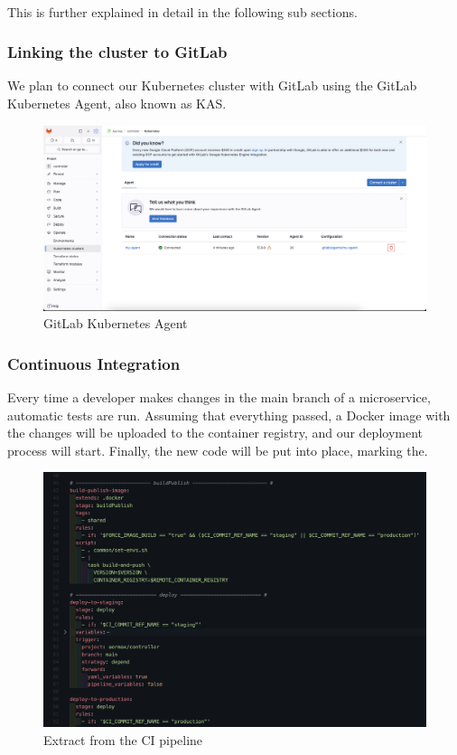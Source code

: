 \paragraph{}
This is further explained in detail in the following sub sections.

\subsubsection{Linking the cluster to GitLab}
We plan to connect our Kubernetes cluster with GitLab using the GitLab Kubernetes Agent, also known as KAS.


\begin{figure}[H]
  \centering
  \includegraphics[width=1\textwidth]{src/assets/chapters/linkingrepowithkuber.png}
  \caption{GitLab Kubernetes Agent}
  \label{fig:gitlab-kuber}
\end{figure}


\subsubsection{Continuous Integration}
Every time a developer makes changes in the main branch of a microservice, automatic tests are run. Assuming that everything passed, a Docker image with the changes will be uploaded to the container registry, and our deployment process will start. Finally, the new code will be put into place, marking the.


\begin{figure}[H]
  \centering
  \includegraphics[width=1\textwidth]{src/assets/chapters/ci.png}
  \caption{Extract from the CI pipeline}
  \label{fig:ci-pipeline}
\end{figure}


